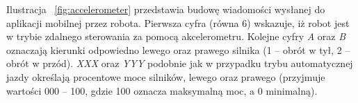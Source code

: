 Ilustracja ~\ref{fig:accelerometer} przedstawia budowę wiadomości wysłanej do aplikacji mobilnej przez robota. Pierwsza cyfra (równa 6) wskazuje, iż robot jest w trybie zdalnego sterowania za pomocą akcelerometru. Kolejne cyfry \textit{A} oraz \textit{B} oznaczają kierunki odpowiedno lewego oraz prawego silnika (1 – obrót w tył, 2 – obrót w przód). \textit{XXX} oraz \textit{YYY} podobnie jak w przypadku trybu automatycznej jazdy określają procentowe moce silników, lewego oraz prawego (przyjmuje wartości 000 – 100, gdzie 100 oznacza maksymalną moc, a 0 minimalną).  

